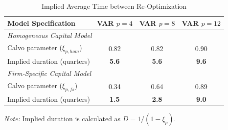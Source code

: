\begin{table}[htpb]
    \centering
    \small
    \renewcommand{\arraystretch}{1.2}
    \caption{Implied Average Time between Re-Optimization}
    \label{tab:implied_duration_4_8_12}
    \begin{tabular}{lccc}
        \toprule
        \textbf{Model Specification} & \textbf{VAR $p=4$} & \textbf{VAR $p=8$} & \textbf{VAR $p=12$} \\
        \midrule

        \multicolumn{4}{l}{\textit{Homogeneous Capital Model}} \\
        Calvo parameter ($\xi_{p, hom}$) & 0.82 & 0.82 & 0.90 \\
        Implied duration (quarters)      & \textbf{5.6} & \textbf{5.6} & \textbf{9.6} \\

        \midrule
        \multicolumn{4}{l}{\textit{Firm-Specific Capital Model}} \\
        Calvo parameter ($\xi_{p, fs}$) & 0.34 & 0.64 & 0.89 \\
        Implied duration (quarters)     & \textbf{1.5} & \textbf{2.8} & \textbf{9.0} \\

        \bottomrule
    \end{tabular}

    \vspace{0.2cm}
    \raggedright
    \scriptsize{\textit{Note:} Implied duration is calculated as $D = 1/(1 - \xi_p)$.}
\end{table}

